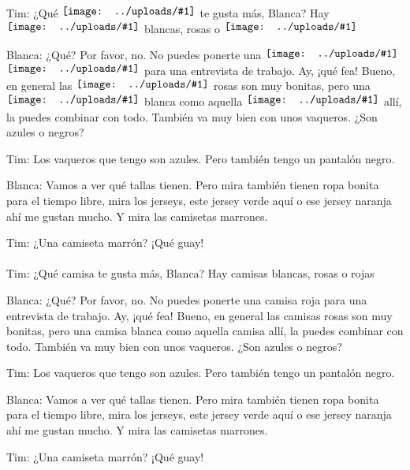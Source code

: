 \documentclass[12pt,a4paper]{scrartcl}
\newcommand{\wimgup}[1]{\begin{tikzpicture} \draw (0, 0) node[inner sep=0] {\texttt{[image: ../uploads/\#1]}};\end{tikzpicture}}
\begin{document}
	\vspace*{\fill}
	\Large
	Tim: ¿Qué  $\wimgup{phpBA95.png} $ te gusta más, Blanca? Hay  $\wimgup{phpBA95.png} $ blancas, rosas o  $\wimgup{phpC945.png} $

Blanca: ¿Qué? Por favor, no. No puedes ponerte una  $\wimgup{phpBA95.png} $  $\wimgup{phpC945.png} $ para una entrevista de trabajo. Ay, ¡qué fea! Bueno, en general las  $\wimgup{phpBA95.png} $ rosas son muy bonitas, pero una  $\wimgup{phpBA95.png} $ blanca  como aquella  $\wimgup{phpBA95.png} $ allí, la puedes combinar con todo. También va muy bien con unos vaqueros. ¿Son azules o negros?

Tim: Los vaqueros que tengo son azules. Pero también tengo un pantalón negro.

Blanca: Vamos a ver qué tallas tienen. Pero mira también tienen ropa bonita para el tiempo libre, mira los jerseys, este jersey verde aquí o ese jersey naranja ahí me gustan mucho. Y mira las camisetas marrones.



Tim: ¿Una camiseta marrón? ¡Qué guay!
 \\ \vspace*{\fill} \pagebreak \vspace*{\fill} 
 \\  
Tim: ¿Qué camisa te gusta más, Blanca? Hay camisas blancas, rosas o rojas

Blanca: ¿Qué? Por favor, no. No puedes ponerte una camisa roja para una entrevista de trabajo. Ay, ¡qué fea! Bueno, en general las camisas rosas son muy bonitas, pero una camisa blanca  como aquella camisa allí, la puedes combinar con todo. También va muy bien con unos vaqueros. ¿Son azules o negros?

Tim: Los vaqueros que tengo son azules. Pero también tengo un pantalón negro.

Blanca: Vamos a ver qué tallas tienen. Pero mira también tienen ropa bonita para el tiempo libre, mira los jerseys, este jersey verde aquí o ese jersey naranja ahí me gustan mucho. Y mira las camisetas marrones.



Tim: ¿Una camiseta marrón? ¡Qué guay!
\vspace*{\fill}
\end{document}
